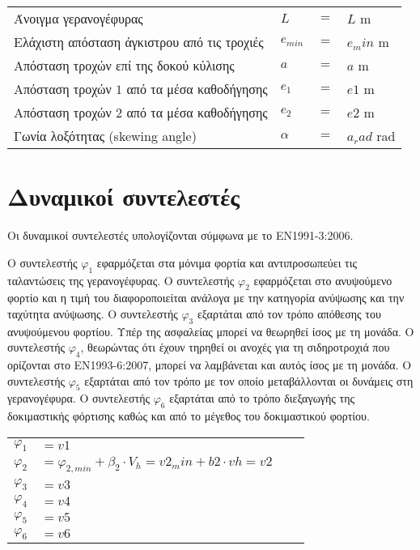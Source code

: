 \begin{tabular}{llcl}
    Άνοιγμα γερανογέφυρας                         &$L$          &$=$ &${{ L }}$ m \\
    Ελάχιστη απόσταση άγκιστρου από τις τροχιές   &$e_{min}$    &$=$ &${{ e_min }}$ m \\
    Απόσταση τροχών επί της δοκού κύλισης         &$a$          &$=$ &${{ a }}$ m \\
    Απόσταση τροχών $1$ από τα μέσα καθοδήγησης   &$e_1$        &$=$ &${{ e1 }}$ m \\
    Απόσταση τροχών $2$ από τα μέσα καθοδήγησης   &$e_2$        &$=$ &${{ e2 }}$ m \\
    Γωνία λοξότητας (skewing angle)               &$α$          &$=$ &${{ a_rad }}$ rad
\end{tabular}

\section{Δυναμικοί συντελεστές}
Οι δυναμικοί συντελεστές υπολογίζονται σύμφωνα με το ΕΝ1991-3:2006.

Ο συντελεστής $φ_1$ εφαρμόζεται στα μόνιμα φορτία και αντιπροσωπεύει τις ταλαντώσεις της
γερανογέφυρας. Ο συντελεστής $φ_2$ εφαρμόζεται στο ανυψούμενο φορτίο και η τιμή του διαφοροποιείται
ανάλογα με την κατηγορία ανύψωσης και την ταχύτητα ανύψωσης. Ο συντελεστής $φ_3$ εξαρτάται από τον
τρόπο απόθεσης του ανυψούμενου φορτίου. Υπέρ της ασφαλείας μπορεί να θεωρηθεί ίσος με τη μονάδα.
Ο συντελεστής $φ_4$, θεωρώντας ότι έχουν τηρηθεί οι ανοχές για τη σιδηροτροχιά που ορίζονται στο
ΕΝ1993-6:2007, μπορεί να λαμβάνεται και αυτός ίσος με τη μονάδα. Ο συντελεστής $φ_5$ εξαρτάται από
τον τρόπο με τον οποίο μεταβάλλονται οι δυνάμεις στη γερανογέφυρα. Ο συντελεστής $φ_6$ εξαρτάται από
το τρόπο διεξαγωγής της δοκιμαστικής φόρτισης καθώς και από το μέγεθος του δοκιμαστικού φορτίου.

\begin{tabular}{llcr}
    $φ_1$ &$= {{ v1 }} $ \\
    $φ_2$ &$= φ_{2,min} + β_2 \cdot V_h = {{ v2_min }} + {{ b2 }} \cdot {{ vh }} = {{ v2 }} $ \\
    $φ_3$ &$= {{ v3 }} $ \\
    $φ_4$ &$= {{ v4 }} $ \\
    $φ_5$ &$= {{ v5 }} $ \\
    $φ_6$ &$= {{ v6 }} $
\end{tabular}
